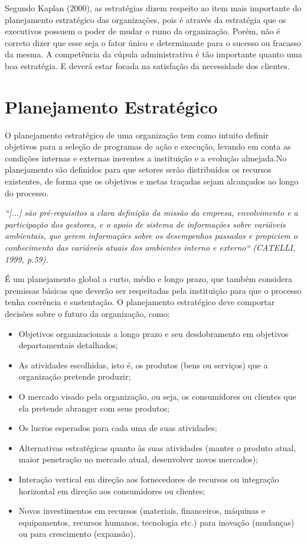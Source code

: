 \documentclass[12pt,a4paper,ruledheader,tocpage=prefix,floatnumber=continuous,pagestart=folhaderosto,font=times]{abnt}
\begin{document}
Segundo Kaplan (2000), as estratégias dizem respeito ao item mais importante do planejamento estratégico das organizações, pois é através da estratégia
que os executivos possuem o poder de mudar o rumo da organização. Porém, não é correto dizer que esse seja o fator único e determinante para o sucesso ou
fracasso da mesma. A competência da cúpula administrativa é tão importante quanto uma boa estratégia. E deverá estar focada na satisfação da necessidade
dos clientes.

\section{Planejamento Estratégico}
O planejamento estratégico de uma organização tem como intuito definir objetivos para a seleção de programas de ação e execução, levando em conta as 
condições internas e externas inerentes a instituição e a evolução almejada.No planejamento são definidos para que setores serão distribuídos os recursos 
existentes, de forma que os objetivos e metas traçadas sejam alcançados ao longo do processo. 

\begin{flushright}
 \hfill \textit{``[...] são pré-requisitos a clara definição da missão da empresa, envolvimento e a participação dos gestores, e o apoio de sistema de 
informações sobre variáveis ambientais, que gerem informações sobre os desempenhos passados e propiciem o conhecimento das variáveis atuais dos 
ambientes interno e externo`` (CATELLI, 1999, p.59).}
\end{flushright}

É um planejamento global a curto, médio e longo prazo, que também  considera premissas básicas que deverão ser respeitadas pela instituição para que o 
processo tenha coerência e sustentação. O planejamento estratégico deve comportar decisões sobre o futuro da organização, como:\cite{rodolfo} 

\begin{itemize}	
\item Objetivos organizacionais a longo prazo e seu desdobramento em objetivos departamentais detalhados; 
\item As atividades escolhidas, isto é, os produtos (bens ou serviços) que a organização pretende produzir;
\item O mercado visado pela organização, ou seja, os consumidores ou clientes que ela pretende abranger com seus produtos;
\item Os lucros esperados para cada uma de suas atividades;
\item Alternativas estratégicas quanto às suas atividades (manter o produto atual, maior penetração no mercado atual, desenvolver novos mercados);
\item Interação vertical em direção aos fornecedores de recursos ou integração horizontal em direção aos consumidores ou clientes;
\item Novos investimentos em recursos (materiais, financeiros, máquinas e equipamentos, recursos humanos, tecnologia etc.) para inovação (mudanças) ou para crescimento (expansão).
\end{itemize}
\end{document}

